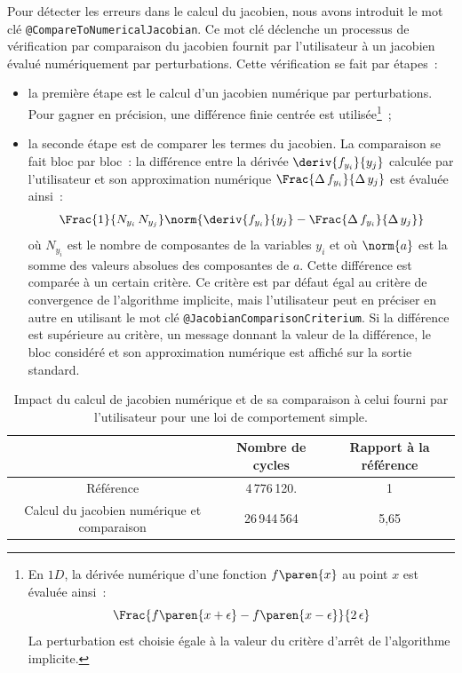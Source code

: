 \documentclass[rectoverso,pleiades,pstricks,leqno,anti]{texmf/note_technique_2010}
\begin{document}
Pour détecter les erreurs dans le calcul du jacobien, nous avons
introduit le mot clé \texttt{@Compare\-To\-Numerical\-Jacobian}. Ce
mot clé déclenche un processus de vérification par comparaison du
jacobien fournit par l'utilisateur à un jacobien évalué numériquement
par perturbations. Cette vérification se fait par étapes~:
\begin{itemize}
  \item la première étape est le calcul d'un jacobien numérique par
  perturbations. Pour gagner en précision, une différence finie centrée
  est utilisée\footnote{En \(1D\), la dérivée numérique d'une fonction
    \(f\paren{x}\) au point \(x\) est évaluée ainsi~:
    \[
    \Frac{f\paren{x+\epsilon}-f\paren{x-\epsilon}}{2\,\epsilon}
    \]
    La perturbation est choisie égale à la valeur du critère d'arrêt de
    l'algorithme implicite.
  }~;
  \item la seconde étape est de comparer les termes du jacobien. La
  comparaison se fait bloc par bloc~: la différence entre la dérivée
  \(\deriv{f_{y_{i}}}{y_{j}}\) calculée par l'utilisateur et son
  approximation numérique \(\Frac{\Delta\,f_{y_{i}}}{\Delta\,y_{j}}\)
  est évaluée ainsi~:
  \[
  \Frac{1}{N_{y_{i}}\,N_{y_{j}}}\norm{\deriv{f_{y_{i}}}{y_{j}}-\Frac{\Delta\,f_{y_{i}}}{\Delta\,y_{j}}}
  \]
  où \(N_{y_{i}}\) est le nombre de composantes de la variables
  \(y_{i}\) et où \(\norm{a}\) est la somme des valeurs absolues des
  composantes de \(a\). Cette différence est comparée à un certain
  critère. Ce critère est par défaut égal au critère de convergence de
  l'algorithme implicite, mais l'utilisateur peut en préciser en autre en
  utilisant le mot clé {\tt @Jacobian\-Comparison\-Criterium}. Si la
  différence est supérieure au critère, un message donnant la valeur de la
  différence, le bloc considéré et son approximation numérique est affiché
  sur la sortie standard.
\end{itemize}

\begin{table}
  \centering
  \begin{tabular}{|c|c|c|}
    \cline{2-3}
    \multicolumn{1}{c|}{} & 
    \begin{minipage}{4cm}
      Nombre de cycles
    \end{minipage} &
    \begin{minipage}{4cm}
      Rapport à la référence
    \end{minipage} \\
    \hline
    Référence             & 4\,776\,120. & 1 \\
    \hline
    \begin{minipage}[p]{4cm}
    Calcul du jacobien numérique et comparaison  
    \end{minipage}
    & 26\,944\,564 & 5,65\\
    \hline
  \end{tabular}
  \label{tab:NR:nJ}
  \caption{Impact du calcul de jacobien numérique et de sa comparaison à
    celui fourni par l'utilisateur pour une loi de comportement simple.}
\end{table}
\end{document}

